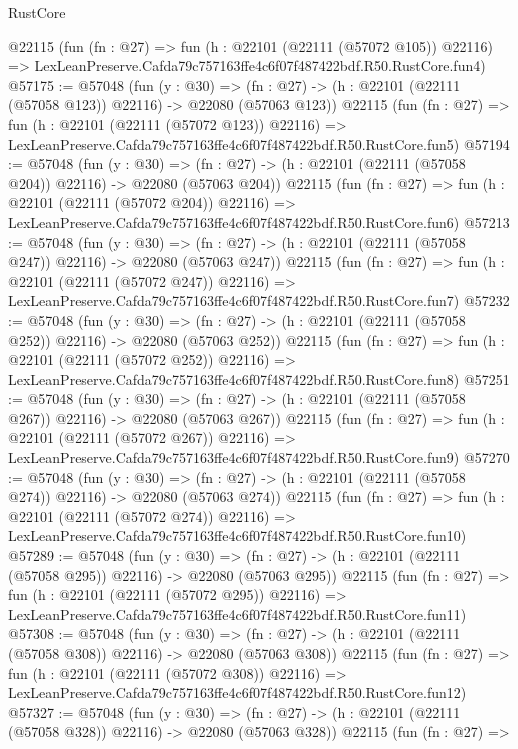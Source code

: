 \begin{lexlean}{RustCore}
\begin{coremodule}
    @22115
    (fun (fn : @27) =>
    fun (h : @22101 (@22111 (@57072 @105)) @22116) =>
    LexLeanPreserve.Cafda79c757163ffe4c6f07f487422bdf.R50.RustCore.fun4)
@57175 := @57048
    (fun (y : @30) =>
    (fn : @27) -> (h : @22101 (@22111 (@57058 @123)) @22116) -> @22080 (@57063 @123))
    @22115
    (fun (fn : @27) =>
    fun (h : @22101 (@22111 (@57072 @123)) @22116) =>
    LexLeanPreserve.Cafda79c757163ffe4c6f07f487422bdf.R50.RustCore.fun5)
@57194 := @57048
    (fun (y : @30) =>
    (fn : @27) -> (h : @22101 (@22111 (@57058 @204)) @22116) -> @22080 (@57063 @204))
    @22115
    (fun (fn : @27) =>
    fun (h : @22101 (@22111 (@57072 @204)) @22116) =>
    LexLeanPreserve.Cafda79c757163ffe4c6f07f487422bdf.R50.RustCore.fun6)
@57213 := @57048
    (fun (y : @30) =>
    (fn : @27) -> (h : @22101 (@22111 (@57058 @247)) @22116) -> @22080 (@57063 @247))
    @22115
    (fun (fn : @27) =>
    fun (h : @22101 (@22111 (@57072 @247)) @22116) =>
    LexLeanPreserve.Cafda79c757163ffe4c6f07f487422bdf.R50.RustCore.fun7)
@57232 := @57048
    (fun (y : @30) =>
    (fn : @27) -> (h : @22101 (@22111 (@57058 @252)) @22116) -> @22080 (@57063 @252))
    @22115
    (fun (fn : @27) =>
    fun (h : @22101 (@22111 (@57072 @252)) @22116) =>
    LexLeanPreserve.Cafda79c757163ffe4c6f07f487422bdf.R50.RustCore.fun8)
@57251 := @57048
    (fun (y : @30) =>
    (fn : @27) -> (h : @22101 (@22111 (@57058 @267)) @22116) -> @22080 (@57063 @267))
    @22115
    (fun (fn : @27) =>
    fun (h : @22101 (@22111 (@57072 @267)) @22116) =>
    LexLeanPreserve.Cafda79c757163ffe4c6f07f487422bdf.R50.RustCore.fun9)
@57270 := @57048
    (fun (y : @30) =>
    (fn : @27) -> (h : @22101 (@22111 (@57058 @274)) @22116) -> @22080 (@57063 @274))
    @22115
    (fun (fn : @27) =>
    fun (h : @22101 (@22111 (@57072 @274)) @22116) =>
    LexLeanPreserve.Cafda79c757163ffe4c6f07f487422bdf.R50.RustCore.fun10)
@57289 := @57048
    (fun (y : @30) =>
    (fn : @27) -> (h : @22101 (@22111 (@57058 @295)) @22116) -> @22080 (@57063 @295))
    @22115
    (fun (fn : @27) =>
    fun (h : @22101 (@22111 (@57072 @295)) @22116) =>
    LexLeanPreserve.Cafda79c757163ffe4c6f07f487422bdf.R50.RustCore.fun11)
@57308 := @57048
    (fun (y : @30) =>
    (fn : @27) -> (h : @22101 (@22111 (@57058 @308)) @22116) -> @22080 (@57063 @308))
    @22115
    (fun (fn : @27) =>
    fun (h : @22101 (@22111 (@57072 @308)) @22116) =>
    LexLeanPreserve.Cafda79c757163ffe4c6f07f487422bdf.R50.RustCore.fun12)
@57327 := @57048
    (fun (y : @30) =>
    (fn : @27) -> (h : @22101 (@22111 (@57058 @328)) @22116) -> @22080 (@57063 @328))
    @22115
    (fun (fn : @27) =>

\end{coremodule}
\end{lexlean}
